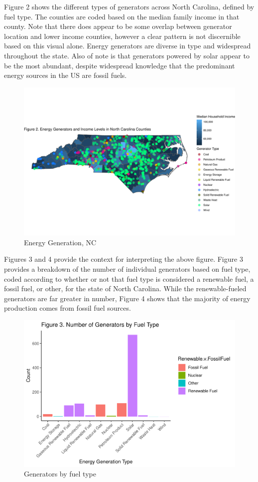 \documentclass[
  12pt,
]{article}
\begin{document}
Figure 2 shows the different types of generators across North Carolina,
defined by fuel type. The counties are coded based on the median family
income in that county. Note that there does appear to be some overlap
between generator location and lower income counties, however a clear
pattern is not discernible based on this visual alone. Energy generators
are diverse in type and widespread throughout the state. Also of note is
that generators powered by solar appear to be the most abundant, despite
widespread knowledge that the predominant energy sources in the US are
fossil fuels.

\begin{figure}
\centering
\includegraphics{Project_files/figure-latex/unnamed-chunk-2-1.pdf}
\caption{Energy Generation, NC}
\end{figure}

Figures 3 and 4 provide the context for interpreting the above figure.
Figure 3 provides a breakdown of the number of individual generators
based on fuel type, coded according to whether or not that fuel type is
considered a renewable fuel, a fossil fuel, or other, for the state of
North Carolina. While the renewable-fueled generators are far greater in
number, Figure 4 shows that the majority of energy production comes from
fossil fuel sources.

\begin{figure}
\centering
\includegraphics{Project_files/figure-latex/unnamed-chunk-3-1.pdf}
\caption{Generators by fuel type}
\end{figure}
\end{document}
